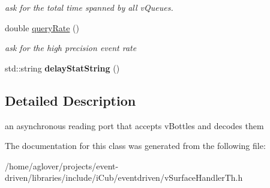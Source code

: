 \begin{DoxyCompactItemize}
\begin{DoxyCompactList}\small\item\em ask for the total time spanned by all v\+Queues. \end{DoxyCompactList}\item 
double \hyperlink{classev_1_1queueAllocator_a39005a8e9337279debe435ae26c7d6fd}{query\+Rate} ()\hypertarget{classev_1_1queueAllocator_a39005a8e9337279debe435ae26c7d6fd}{}\label{classev_1_1queueAllocator_a39005a8e9337279debe435ae26c7d6fd}

\begin{DoxyCompactList}\small\item\em ask for the high precision event rate \end{DoxyCompactList}\item 
std\+::string {\bfseries delay\+Stat\+String} ()\hypertarget{classev_1_1queueAllocator_a10282570a776a59efd302bb336109748}{}\label{classev_1_1queueAllocator_a10282570a776a59efd302bb336109748}

\end{DoxyCompactItemize}


\subsection{Detailed Description}
an asynchronous reading port that accepts v\+Bottles and decodes them 

The documentation for this class was generated from the following file\+:\begin{DoxyCompactItemize}
\item 
/home/aglover/projects/event-\/driven/libraries/include/i\+Cub/eventdriven/v\+Surface\+Handler\+Th.\+h\end{DoxyCompactItemize}
